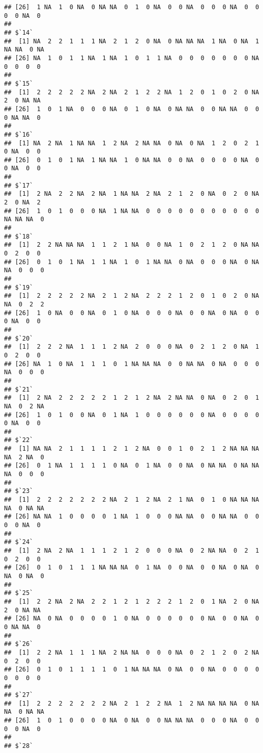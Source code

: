 \documentclass[
]{article}
\begin{document}
\begin{verbatim}
## [26]  1 NA  1  0 NA  0 NA NA  0  1  0 NA  0  0 NA  0  0  0 NA  0  0  0  0 NA  0
## 
## $`14`
##  [1] NA  2  2  1  1  1 NA  2  1  2  0 NA  0 NA NA NA  1 NA  0 NA  1 NA NA  0 NA
## [26] NA  1  0  1  1 NA  1 NA  1  0  1  1 NA  0  0  0  0  0  0  0 NA  0  0  0  0
## 
## $`15`
##  [1]  2  2  2  2  2 NA  2 NA  2  1  2  2 NA  1  2  0  1  0  2  0 NA  2  0 NA NA
## [26]  1  0  1 NA  0  0  0 NA  0  1  0 NA  0 NA NA  0  0 NA NA  0  0  0 NA NA  0
## 
## $`16`
##  [1] NA  2 NA  1 NA NA  1  2 NA  2 NA NA  0 NA  0 NA  1  2  0  2  1  0 NA  0  0
## [26]  0  1  0  1 NA  1 NA NA  1  0 NA NA  0  0 NA  0  0  0  0 NA  0  0 NA  0  0
## 
## $`17`
##  [1]  2 NA  2  2 NA  2 NA  1 NA NA  2 NA  2  1  2  0 NA  0  2  0 NA  2  0 NA  2
## [26]  1  0  1  0  0  0 NA  1 NA NA  0  0  0  0  0  0  0  0  0  0  0 NA NA NA  0
## 
## $`18`
##  [1]  2  2 NA NA NA  1  1  2  1 NA  0  0 NA  1  0  2  1  2  0 NA NA  0  2  0  0
## [26]  0  1  0  1 NA  1  1 NA  1  0  1 NA NA  0 NA  0  0  0 NA  0 NA NA  0  0  0
## 
## $`19`
##  [1]  2  2  2  2  2 NA  2  1  2 NA  2  2  2  1  2  0  1  0  2  0 NA NA  0  2  2
## [26]  1  0 NA  0  0 NA  0  1  0 NA  0  0  0 NA  0  0 NA  0 NA  0  0  0 NA  0  0
## 
## $`20`
##  [1]  2  2  2 NA  1  1  1  2 NA  2  0  0  0 NA  0  2  1  2  0 NA  1  0  2  0  0
## [26] NA  1  0 NA  1  1  1  0  1 NA NA NA  0  0 NA NA  0 NA  0  0  0 NA  0  0  0
## 
## $`21`
##  [1]  2 NA  2  2  2  2  2  1  2  1  2 NA  2 NA NA  0 NA  0  2  0  1 NA  0  2 NA
## [26]  1  0  1  0  0 NA  0  1 NA  1  0  0  0  0  0  0 NA  0  0  0  0  0 NA  0  0
## 
## $`22`
##  [1] NA NA  2  1  1  1  1  2  1  2 NA  0  0  1  0  2  1  2 NA NA NA NA  2 NA  0
## [26]  0  1 NA  1  1  1  1  0 NA  0  1 NA  0  0 NA  0 NA NA  0 NA NA NA  0  0  0
## 
## $`23`
##  [1]  2  2  2  2  2  2  2 NA  2  1  2 NA  2  1 NA  0  1  0 NA NA NA NA  0 NA NA
## [26] NA NA  1  0  0  0  0  1 NA  1  0  0  0 NA NA  0  0 NA NA  0  0  0  0 NA  0
## 
## $`24`
##  [1]  2 NA  2 NA  1  1  1  2  1  2  0  0  0 NA  0  2 NA NA  0  2  1  0  2  0  0
## [26]  0  1  0  1  1  1 NA NA NA  0  1 NA  0  0 NA  0  0 NA  0 NA  0 NA  0 NA  0
## 
## $`25`
##  [1]  2  2 NA  2 NA  2  2  1  2  1  2  2  2  1  2  0  1 NA  2  0 NA  2  0 NA NA
## [26] NA  0 NA  0  0  0  0  1  0 NA  0  0  0  0  0  0 NA  0  0 NA  0  0 NA NA  0
## 
## $`26`
##  [1]  2  2 NA  1  1  1 NA  2 NA NA  0  0  0 NA  0  2  1  2  0  2 NA  0  2  0  0
## [26]  0  1  0  1  1  1  1  0  1 NA NA NA  0 NA  0  0 NA  0  0  0  0  0  0  0  0
## 
## $`27`
##  [1]  2  2  2  2  2  2  2 NA  2  1  2  2 NA  1  2 NA NA NA NA  0 NA NA  0 NA NA
## [26]  1  0  1  0  0  0  0 NA  0 NA  0  0 NA NA NA  0  0  0 NA  0  0  0  0 NA  0
## 
## $`28`

\end{verbatim}
\end{document}
